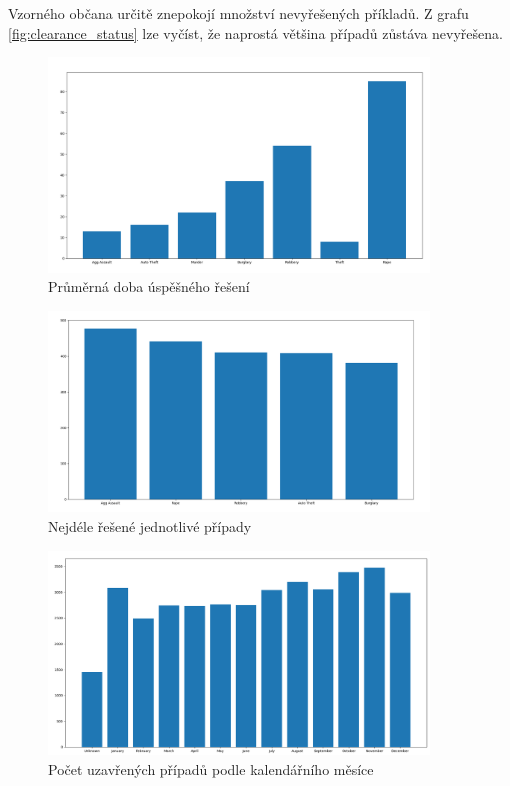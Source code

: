 \documentclass{article}
\begin{document}
Vzorného občana určitě znepokojí množství nevyřešených příkladů. Z grafu \ref{fig:clearance_status}
lze vyčíst, že naprostá většina případů zůstáva nevyřešena.

\begin{figure}
  \centering
  \includegraphics[width=0.9\textwidth]{figures/clearance_time.png}
  \caption{Průměrná doba úspěšného řešení}
\end{figure}

\begin{figure}
  \centering
  \includegraphics[width=0.9\textwidth]{figures/top_clearance_times.png}
  \caption{Nejdéle řešené jednotlivé případy}
\end{figure}

\begin{figure}
  \centering
  \includegraphics[width=0.9\textwidth]{figures/clearance_by_month.png}
  \caption{Počet uzavřených případů podle kalendářního měsíce}
\end{figure}
\end{document}
